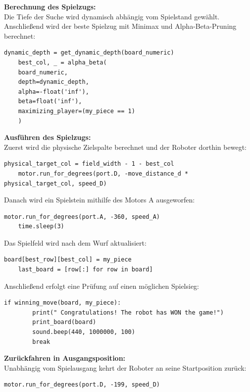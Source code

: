 \textbf{Berechnung des Spielzugs:}\\
Die Tiefe der Suche wird dynamisch abhängig vom Spielstand gewählt. Anschließend wird der beste Spielzug mit Minimax und Alpha-Beta-Pruning berechnet:

\begin{lstlisting}[style=pythonstyle]
	dynamic_depth = get_dynamic_depth(board_numeric)
	best_col, _ = alpha_beta(
	board_numeric,
	depth=dynamic_depth,
	alpha=-float('inf'),
	beta=float('inf'),
	maximizing_player=(my_piece == 1)
	)
\end{lstlisting}

\textbf{Ausführen des Spielzugs:}\\
Zuerst wird die physische Zielspalte berechnet und der Roboter dorthin bewegt:

\begin{lstlisting}[style=pythonstyle]
	physical_target_col = field_width - 1 - best_col
	motor.run_for_degrees(port.D, -move_distance_d * physical_target_col, speed_D)
\end{lstlisting}

Danach wird ein Spielstein mithilfe des Motors A ausgeworfen:

\begin{lstlisting}[style=pythonstyle]
	motor.run_for_degrees(port.A, -360, speed_A)
	time.sleep(3)
\end{lstlisting}

Das Spielfeld wird nach dem Wurf aktualisiert:

\begin{lstlisting}[style=pythonstyle]
	board[best_row][best_col] = my_piece
	last_board = [row[:] for row in board]
\end{lstlisting}

Anschließend erfolgt eine Prüfung auf einen möglichen Spielsieg:

\begin{lstlisting}[style=pythonstyle]
	if winning_move(board, my_piece):
		print(" Congratulations! The robot has WON the game!")
		print_board(board)
		sound.beep(440, 1000000, 100)
		break
\end{lstlisting}

\textbf{Zurückfahren in Ausgangsposition:}\\

Unabhängig vom Spielausgang kehrt der Roboter an seine Startposition zurück:

\begin{lstlisting}[style=pythonstyle]
	motor.run_for_degrees(port.D, -199, speed_D)
\end{lstlisting}

